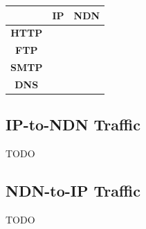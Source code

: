 \begin{table}[t]
    \begin{tabular}{|c||c|c|}
    \hline
    ~    & {\bf IP} & {\bf NDN} \\ \hline
    {\bf HTTP} & ~ & ~ \\ \hline
    {\bf FTP}  & ~ & ~ \\ \hline
    {\bf SMTP} & ~ & ~ \\ \hline
    {\bf DNS}  & ~ & ~ \\ \hline
    \end{tabular}
\end{table}

\subsection{IP-to-NDN Traffic}
TODO

\subsection{NDN-to-IP Traffic}
TODO